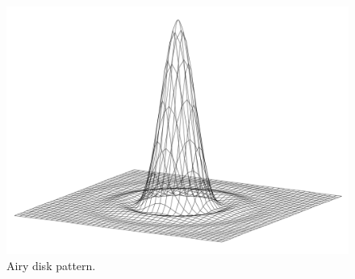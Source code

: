 \begin{figure}[ht!]
\centering
\includegraphics[scale = 0.15]{chapters/img/diffraction_airydisk.png}
\caption{Airy disk pattern.}
\label{fig:airydisk}
\end{figure}